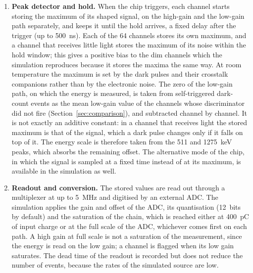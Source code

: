 \documentclass[11pt]{article}
\begin{document}
\begin{enumerate}
\item {\bf Peak detector and hold.} When the chip triggers, each channel
  starts storing the maximum of its shaped signal, on the high-gain and the
  low-gain path separately, and keeps it until the hold arrives, a fixed
  delay after the trigger (up to 500~ns). Each of the 64
  channels stores its own maximum, and a channel that receives little light
  stores the maximum of its noise within the hold window; this gives a
  positive bias to the dim channels which the simulation reproduces because
  it stores the maxima the same way. At room temperature the maximum is
  set by the dark pulses and their crosstalk companions rather than by the
  electronic noise. The zero of the low-gain path, on which the energy is
  measured, is taken from self-triggered dark-count events as the mean
  low-gain value of the channels whose discriminator did not fire
  (Section~\ref{sec:comparison}), and subtracted channel by channel. It is
  not exactly an additive constant: in a channel that receives light the
  stored maximum is that of the signal, which a dark pulse changes only if
  it falls on top of it. The energy scale is therefore taken from the 511
  and 1275~keV peaks, which absorbs the remaining offset. The alternative
  mode of the chip, in
  which the signal is sampled at a fixed time instead of at its maximum, is
  available in the simulation as well.
\item {\bf Readout and conversion.} The stored values are read out through a
  multiplexer at up to 5~MHz and digitised by an external ADC. The simulation
  applies the gain and offset of the ADC, its quantisation (12~bits by
  default) and the saturation of the chain, which is reached either at
  400~pC of input charge or at the full scale of the ADC, whichever comes
  first on each path. A high gain at full scale is not a saturation of the
  measurement, since the energy is read on the low gain; a channel is
  flagged when its low gain saturates. The dead time of the readout is recorded but does not
  reduce the number of events, because the rates of the simulated source are low.
\end{enumerate}
\end{document}
